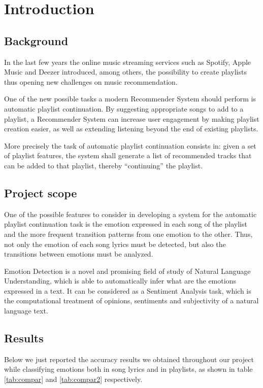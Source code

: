 \chapter{Introduction}
\section{Background}
In the last few years the online music streaming services such as Spotify, Apple Music and Deezer introduced, among others,  the possibility to create playlists thus opening new challenges on music recommendation.\par
One of the new possible tasks a modern Recommender System should perform is automatic playlist continuation. By suggesting appropriate songs to add to a playlist, a Recommender System can increase user engagement by making playlist creation easier, as well as extending listening beyond the end of existing playlists. \par
More precisely the task of automatic playlist continuation consists in: given a set of playlist features, the system shall generate a list of recommended tracks that can be added to that playlist, thereby ``continuing'' the playlist. \par

\section{Project scope}
One of the possible features to consider in developing a system for the automatic playlist continuation task is the emotion expressed in each song of the playlist and the more frequent transition patterns from one emotion to the other. Thus, not only the emotion of each song lyrics must be detected, but also the transitions between emotions must be analyzed. \par
Emotion Detection is a novel and promising field of study of Natural Language Understanding, which is able to automatically infer what are the emotions expressed in a text. It can be considered as a Sentiment Analysis task, which is the computational treatment of opinions, sentiments and subjectivity of a natural language text. \par

\section{Results}

Below we just reported the accuracy results we obtained throughout our project while classifying emotions both in song lyrics and in playlists, as shown in table \ref{tab:compar} and \ref{tab:compar2} respectively.

